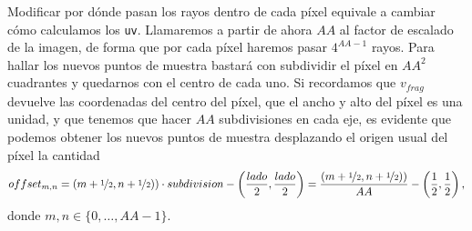 Modificar por dónde pasan los rayos dentro de cada píxel equivale a cambiar cómo calculamos los \texttt{uv}. Llamaremos a partir de ahora $AA$ al factor de escalado de la imagen, de forma que por cada píxel haremos pasar $4^{AA-1}$ rayos. Para hallar los nuevos puntos de muestra bastará con subdividir el píxel en $AA^2$ cuadrantes y quedarnos con el centro de cada uno. Si recordamos que $v_{frag}$ devuelve las coordenadas del centro del píxel, que el ancho y alto del píxel es una unidad, y que tenemos que hacer $AA$ subdivisiones en cada eje, es evidente que podemos obtener los nuevos puntos de muestra desplazando el origen usual del píxel la cantidad
\begin{equation*}
    offset_{m,n} = (m+\nicefrac{1}{2},n+\nicefrac{1}{2}))\cdot subdivision - \left( \frac{lado}{2}, \frac{lado}{2}\right) = \frac{ (m+\nicefrac{1}{2},n+\nicefrac{1}{2}))}{AA} - \left( \frac{1}{2}, \frac{1}{2}\right),
\end{equation*}
donde $m,n\in \{0,\dots, AA-1\}$.\newline
